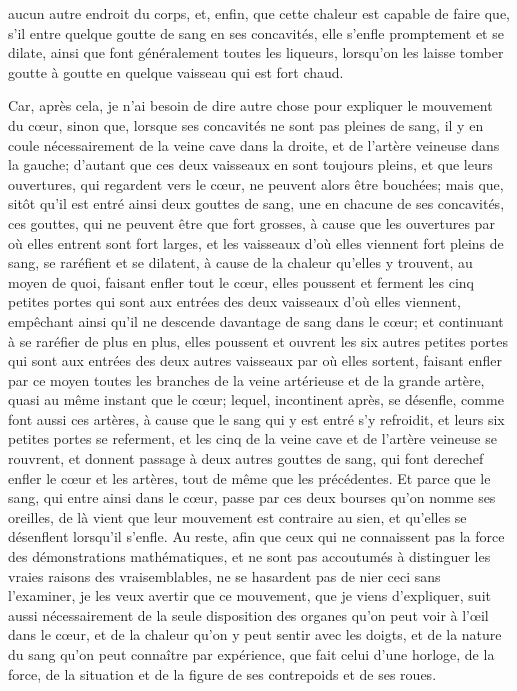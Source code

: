 \documentclass[french,twoside]{book} %
\begin{document}
aucun autre endroit du corps, et, enfin, que cette chaleur est capable de faire que, s'il entre quelque goutte de sang en ses concavités, elle s'enfle promptement et se dilate, ainsi que font généralement toutes les liqueurs, lorsqu'on les laisse tomber goutte à goutte en quelque vaisseau qui est fort chaud.\par
Car, après cela, je n'ai besoin de dire autre chose pour expliquer le mouvement du cœur, sinon que, lorsque ses concavités ne sont pas pleines de sang, il y en coule nécessairement de la veine cave dans la droite, et de l'artère veineuse dans la gauche; d'autant que ces deux vaisseaux en sont toujours pleins, et que leurs ouvertures, qui regardent vers le cœur, ne peuvent alors être bouchées; mais que, sitôt qu'il est entré ainsi deux gouttes de sang, une en chacune de ses concavités, ces gouttes, qui ne peuvent être que fort grosses, à cause que les ouvertures par où elles entrent sont fort larges, et les vaisseaux d'où elles viennent fort pleins de sang, se raréfient et se dilatent, à cause de la chaleur qu'elles y trouvent, au moyen de quoi, faisant enfler tout le cœur, elles poussent et ferment les cinq petites portes qui sont aux entrées des deux vaisseaux d'où elles viennent, empêchant ainsi qu'il ne descende davantage de sang dans le cœur; et continuant à se raréfier de plus en plus, elles poussent et ouvrent les six autres petites portes qui sont aux entrées des deux autres vaisseaux par où elles sortent, faisant enfler par ce moyen toutes les branches de la veine artérieuse et de la grande artère, quasi au même instant que le cœur; lequel, incontinent après, se désenfle, comme font aussi ces artères, à cause que le sang qui y est entré s'y refroidit, et leurs six petites portes se referment, et les cinq de la veine cave et de l'artère veineuse se rouvrent, et donnent passage à deux autres gouttes de sang, qui font derechef enfler le cœur et les artères, tout de même que les précédentes. Et parce que le sang, qui entre ainsi dans le cœur, passe par ces deux bourses qu'on nomme ses oreilles, de là vient que leur mouvement est contraire au sien, et qu'elles se désenflent lorsqu'il s'enfle. Au reste, afin que ceux qui ne connaissent pas la force des démonstrations mathématiques, et ne sont pas accoutumés à distinguer les vraies raisons des vraisemblables, ne se hasardent pas de nier ceci sans l'examiner, je les veux avertir que ce mouvement, que je viens d'expliquer, suit aussi nécessairement de la seule disposition des organes qu'on peut voir à l’œil dans le cœur, et de la chaleur qu'on y peut sentir avec les doigts, et de la nature du sang qu'on peut connaître par expérience, que fait celui d'une horloge, de la force, de la situation et de la figure de ses contrepoids et de ses roues.\par
\end{document}

